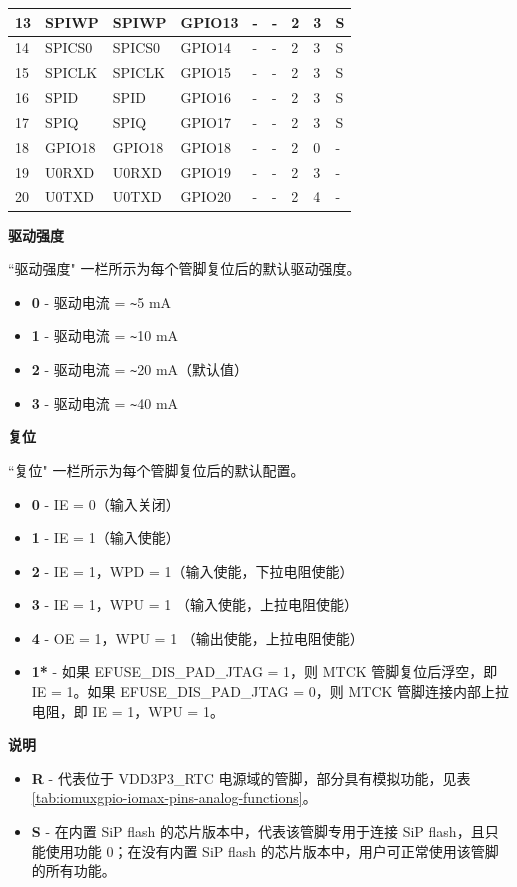 \begin{longtable}[c]{|p{0.7cm}|p{1.9cm}|p{1.5cm}|p{1.5cm}|p{1.5cm}|p{1.5cm}|p{1.5cm}|p{1.0cm}|p{1.0cm}| }
13 & SPIWP           &  SPIWP        & GPIO13  & -          & -            & 2           & 3 & S \\ \hline
14 & SPICS0          &  SPICS0       & GPIO14  & -          & -            & 2           & 3 & S \\ \hline
15 & SPICLK          &  SPICLK       & GPIO15  & -          & -            & 2           & 3 & S \\ \hline
16 & SPID            &  SPID         & GPIO16  & -          & -            & 2           & 3 & S \\ \hline
17 & SPIQ            &  SPIQ         & GPIO17  & -          & -            & 2           & 3 & S \\ \hline
18 & GPIO18          &  GPIO18       & GPIO18  & -          & -            & 2           & 0 & - \\ \hline
19 & U0RXD           &  U0RXD        & GPIO19  & -          & -            & 2           & 3 & - \\ \hline
20 & U0TXD           &  U0TXD        & GPIO20  & -          & -            & 2           & 4 & - \\ \hline

    \end{longtable}
\normalsize

\textbf{驱动强度}

``驱动强度" 一栏所示为每个管脚复位后的默认驱动强度。

\begin{itemize}
\item \textbf{0} - 驱动电流 = \verb+~+5 mA
\item \textbf{1} - 驱动电流 = \verb+~+10 mA
\item \textbf{2} - 驱动电流 = \verb+~+20 mA（默认值）
\item \textbf{3} - 驱动电流 = \verb+~+40 mA
\end{itemize}

\textbf{复位}

``复位" 一栏所示为每个管脚复位后的默认配置。

\begin{itemize}
\item \textbf{0} - IE = 0（输入关闭）
\item \textbf{1} - IE = 1（输入使能）
\item \textbf{2} - IE = 1，WPD = 1（输入使能，下拉电阻使能）
\item \textbf{3} - IE = 1，WPU = 1 （输入使能，上拉电阻使能）
\item \textbf{4} - OE = 1，WPU = 1 （输出使能，上拉电阻使能）
\item \textbf{1*} - 如果 EFUSE\_DIS\_PAD\_JTAG = 1，则 MTCK 管脚复位后浮空，即 IE = 1。如果 EFUSE\_DIS\_PAD\_JTAG = 0，则 MTCK 管脚连接内部上拉电阻，即 IE = 1，WPU = 1。  
\end{itemize}

\textbf{说明}

\begin{itemize}
\item \textbf{R} - 代表位于 VDD3P3\_RTC 电源域的管脚，部分具有模拟功能，见表 \ref{tab:iomuxgpio-iomax-pins-analog-functions}。
\item \textbf{S} - 在内置 SiP flash 的芯片版本中，代表该管脚专用于连接 SiP flash，且只能使用功能 0；在没有内置 SiP flash 的芯片版本中，用户可正常使用该管脚的所有功能。

\end{itemize}
